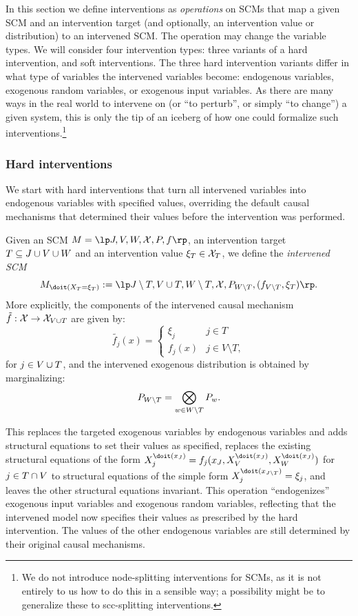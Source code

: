 In this section we define interventions as \emph{operations} on SCMs that map a given SCM and an intervention target (and optionally, an intervention value or distribution) to an intervened SCM. 
The operation may change the variable types. 
We will consider four intervention types: three variants of a hard intervention, and soft interventions. 
The three hard intervention variants differ in what type of variables the intervened variables become: endogenous variables, exogenous random variables, or exogenous input variables.
As there are many ways in the real world to intervene on (or ``to perturb'', or simply ``to change'') a given system, this is only the tip of an iceberg of how one could formalize such interventions.\footnote{We do not introduce node-splitting interventions for SCMs, as it is not entirely to us how to do this in a sensible way; a possibility might be to generalize these to scc-splitting interventions.}

\subsubsection{Hard interventions}

We start with hard interventions that turn all intervened variables into
endogenous variables with specified values, overriding
the default causal mechanisms that determined their values before the
intervention was performed.
\begin{Def}\label{def:scm_hard_intervention}
  Given an SCM $M = \lt \Sin, \Send, \Srnd, \CX, P, f \rt$, an intervention target $T \subseteq J \cup V \cup W$ 
  and an intervention value $\xi_T \in \mathcal{X}_{T}$, we define the \emph{intervened SCM}
  $$M_{\doit(\XT=\xi_T)} := \lt \Sin\setminus T,\Send \cup T,\Srnd \setminus T,\CX,P_{\Srnd\setminus T},(f_{\Send\setminus T},\xi_T) \rt.$$
  More explicitly, the components of the intervened causal mechanism $\tilde{f} : \mathcal{X} \to \mathcal{X}_{V \cup T}$ are
  given by:
    $$\tilde{f_j}(x) = \begin{cases}
      \xi_j & j \in T \\
        f_j(x) & j \in V \setminus T,
    \end{cases}$$
  for $j \in V \cup T$, and the intervened exogenous distribution is obtained by marginalizing:
  $$P_{W\setminus T} = \bigotimes_{w\in W\setminus T} P_w.$$
\end{Def}
This replaces the targeted exogenous variables by endogenous variables and adds structural equations
to set their values as specified, replaces the existing structural equations of the form
$X_j^{\doit(\xJ)} = f_j(\xJ,\XV^{\doit(\xJ)},\XW^{\doit(\xJ)})$ for $j \in T \cap V$ to structural equations of the simple form 
$X_j^{\doit(x_{\Sin\setminus T})} = \xi_j$, and leaves the other structural equations invariant.
This operation ``endogenizes'' exogenous input variables and exogenous random variables,
reflecting that the intervened model now specifies their values as prescribed by the hard intervention.
The values of the other endogenous variables are still determined by their original causal mechanisms.

